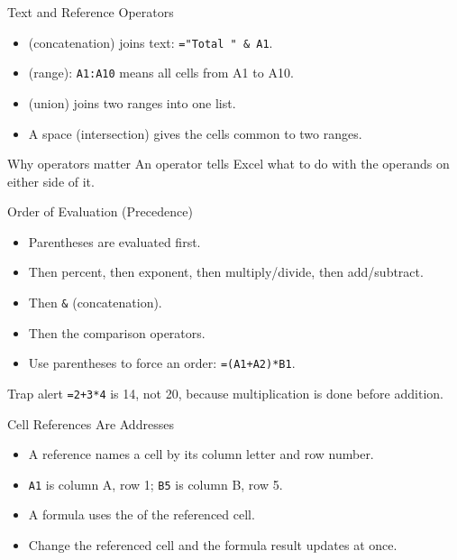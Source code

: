 \documentclass[aspectratio=169]{beamer}
\begin{document}
\begin{frame}{Text and Reference Operators}
  \begin{itemize}
    \item \key{\texttt{\&}} (concatenation) joins text: \texttt{="Total " \& A1}.
    \item \key{\texttt{:}} (range): \texttt{A1:A10} means all cells from A1
      to A10.
    \item \key{\texttt{,}} (union) joins two ranges into one list.
    \item A space (intersection) gives the cells common to two ranges.
  \end{itemize}
  \begin{block}{Why operators matter}
    An operator tells Excel what to do with the operands on either side of it.
  \end{block}
\end{frame}

\begin{frame}{Order of Evaluation (Precedence)}
  \begin{itemize}
    \item Parentheses are evaluated first.
    \item Then percent, then exponent, then multiply/divide, then add/subtract.
    \item Then \texttt{\&} (concatenation).
    \item Then the comparison operators.
    \item Use parentheses to force an order: \texttt{=(A1+A2)*B1}.
  \end{itemize}
  \begin{alertblock}{Trap alert}
    \texttt{=2+3*4} is 14, not 20, because multiplication is done before
    addition.
  \end{alertblock}
\end{frame}

\begin{frame}{Cell References Are Addresses}
  \begin{itemize}
    \item A reference names a cell by its column letter and row number.
    \item \texttt{A1} is column A, row 1; \texttt{B5} is column B, row 5.
    \item A formula uses the  of the referenced cell.
    \item Change the referenced cell and the formula result updates at once.
  \end{itemize}
\end{frame}
\end{document}
